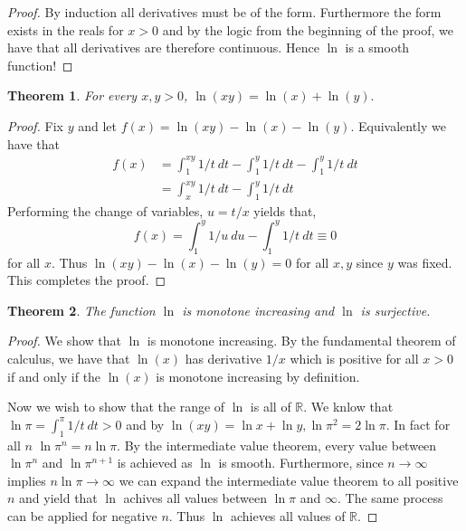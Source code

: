 \documentclass[letter]{article}
\newtheorem{theorem}{Theorem}
\newenvironment{menumerate}{%
  \edef\backupindent{\the\parindent}%
  \enumerate%
  \setlength{\parindent}{\backupindent}%
}{\endenumerate}
\begin{document}
\begin{menumerate}
\begin{menumerate}
\begin{proof}
	 	By induction all derivatives must be of the form. Furthermore the form exists in the reals for $x>0$ and by the logic from the beginning of the proof, we have that all derivatives are therefore continuous. Hence $\ln$ is a smooth function!
	 	\end{proof}
	 \item 
	 \begin{theorem}
	  For every $x,y > 0$, $\ln(xy) = \ln(x) +\ln(y).$
	 \end{theorem}
	 \begin{proof}
	   Fix $y$ and let $f(x) = \ln(xy) - \ln(x) - \ln(y).$ Equivalently we have that 
	   \begin{equation*}
	   \begin{aligned}
	       f(x) &= \int_1^{xy} 1/t\ dt -\int_1^{y} 1/t\ dt - \int_1^{y} 1/t \ dt \\
	       &= \int_x^{xy} 1/t\ dt - \int_1^{y} 1/t\ dt 
	   \end{aligned}
	   \end{equation*}
	   Performing the change of variables, $u = t/x$ yields that, 
	   $$f(x) = \int_1^{y} 1/u\  du - \int_1^{y} 1/t\ dt \equiv 0$$
	   for all $x.$ Thus $\ln(xy) - \ln(x) -\ln(y) = 0$ for all $x,y$ since $y$ was fixed. This completes the proof.
	 \end{proof}
	 \item 
	 \begin{theorem}
	     The function $\ln$ is monotone increasing and $\ln$ is surjective.
	 \end{theorem}
	 \begin{proof}
	 	We show that $\ln$ is monotone increasing. By the fundamental theorem of calculus, we have that $\ln(x)$ has derivative $1/x$ which is positive for all $x> 0$ if and only if the $\ln(x)$ is monotone increasing by definition.

	 	Now we wish to show that the range of $\ln$ is all of $\mathbb{R}.$ We knlow that $\ln \pi  = \int_1^\pi 1/t\ dt > 0$ and by $\ln (xy) = \ln x + \ln y, \ln \pi^2 = 2\ln \pi.$ In fact for all $n$ $\ln \pi^n = n \ln \pi.$ By the intermediate value theorem, every value between $\ln \pi ^n $ and $\ln \pi^{n+1}$ is achieved as $\ln$ is smooth. Furthermore, since $n\to \infty$ implies $n\ln \pi \to \infty$ we can expand the intermediate value theorem to all positive $n$ and yield that $\ln$ achives all values between $\ln \pi$ and $\infty.$ The same process can be applied for negative $n$. Thus $\ln$ achieves all values of $\mathbb{R}.$
	 \end{proof}
	\end{menumerate}



\end{menumerate}
\end{document}
